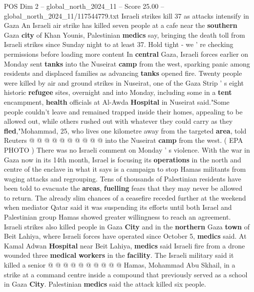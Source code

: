 \begin{textsample}{POS Dim 2 – global\_north\_2024\_11 – Score 25.00 – global\_north\_2024\_11/117544779.txt}  \label{ex:f2_pos_359}
Israeli strikes kill 37 as attacks intensify in Gaza An Israeli air strike has killed seven people at a cafe near the \textbf{southern} Gaza \textbf{city} of Khan Younis, Palestinian \textbf{medics} say, bringing the death toll from Israeli strikes since Sunday night to at least 37.
Hold tight - we ' re checking permissions before loading more content In \textbf{central} Gaza, Israeli forces earlier on Monday sent \textbf{tanks} into the Nuseirat \textbf{camp} from the west, sparking panic among residents and displaced families as advancing \textbf{tanks} opened fire.
Twenty people were killed by air and ground strikes in Nuseirat, one of the Gaza Strip ' s eight historic \textbf{refugee} sites, overnight and into Monday, including some in a \textbf{tent} encampment, \textbf{health} officials at Al-Awda \textbf{Hospital} in Nuseirat said."Some people couldn't leave and remained trapped inside their homes, appealing to be allowed out, while others rushed out with whatever they could carry as they \textbf{fled},"Mohammad, 25, who lives one kilometre away from the targeted \textbf{area}, told Reuters @ @ @ @ @ @ @ @ @ @ into the Nuseirat \textbf{camp} from the west. ( EPA PHOTO ) There was no Israeli comment on Monday ' s violence.
With the war in Gaza now in its 14th month, Israel is focusing its \textbf{operations} in the north and centre of the enclave in what it says is a campaign to stop Hamas militants from waging attacks and regrouping.
Tens of thousands of Palestinian residents have been told to evacuate the \textbf{areas}, \textbf{fuelling} fears that they may never be allowed to return.
The already slim chances of a ceasefire receded further at the weekend when mediator Qatar said it was suspending its efforts until both Israel and Palestinian group Hamas showed greater willingness to reach an agreement.
Israeli strikes also killed people in Gaza \textbf{City} and in the \textbf{northern} Gaza \textbf{town} of Beit Lahiya, where Israeli forces have operated since October 5, \textbf{medics} said.
At Kamal Adwan \textbf{Hospital} near Beit Lahiya, \textbf{medics} said Israeli fire from a drone wounded three \textbf{medical} \textbf{workers} in the \textbf{facility}.
The Israeli military said it killed a senior @ @ @ @ @ @ @ @ @ @ Hamas, Mohammad Abu Skhail, in a strike at a command centre inside a compound that previously served as a school in Gaza \textbf{City}.
Palestinian \textbf{medics} said the attack killed six people.

\end{textsample}
